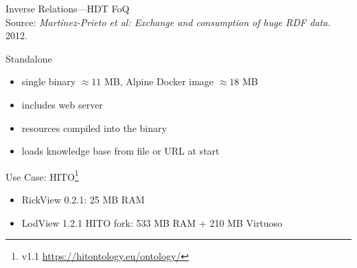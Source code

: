\documentclass[14pt,aspectratio=169]{beamer}
\begin{document}
\begin{frame}[plain]{Inverse Relations---HDT FoQ}
\centering
{}\\
\footnotesize Source: \emph{Martínez-Prieto et al: Exchange and consumption of huge RDF data.} 2012.
\end{frame}


\begin{frame}{Standalone}
\begin{itemize}
\item single binary $\approx 11$ MB, Alpine Docker image $\approx 18$ MB
\item includes web server
\item resources compiled into the binary
\item loads knowledge base from file or URL at start
\end{itemize}
\end{frame}

\begin{frame}{Use Case: HITO\footnote{v1.1 \url{https://hitontology.eu/ontology/}}}
\begin{itemize}
\item RickView 0.2.1: 25 MB RAM
\item LodView 1.2.1 HITO fork: 533 MB RAM + 210 MB Virtuoso
\end{itemize}
\end{frame}
\end{document}
